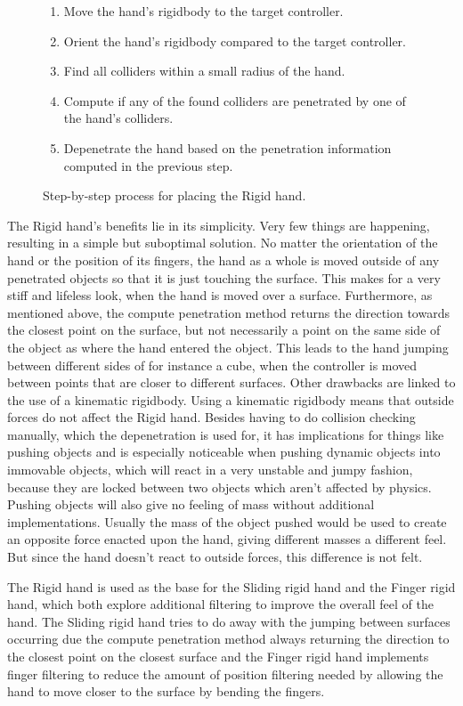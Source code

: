 \begin{figure}[H]
\centering
\small
\begin{enumerate}[noitemsep]
\item Move the hand's rigidbody to the target controller.
\item Orient the hand's rigidbody compared to the target controller.
\item Find all colliders within a small radius of the hand.
\item Compute if any of the found colliders are penetrated by one of the hand's colliders.
\item Depenetrate the hand based on the penetration information computed in the previous step.
\end{enumerate}
\caption{Step-by-step process for placing the Rigid hand.}
\label{fig:stepByStepRigidHand}
\end{figure}

The Rigid hand's benefits lie in its simplicity. Very few things are happening, resulting in a simple but suboptimal solution. No matter the orientation of the hand or the position of its fingers, the hand as a whole is moved outside of any penetrated objects so that it is just touching the surface. This makes for a very stiff and lifeless look, when the hand is moved over a surface. Furthermore, as mentioned above, the compute penetration method returns the direction towards the closest point on the surface, but not necessarily a point on the same side of the object as where the hand entered the object. This leads to the hand jumping between different sides of for instance a cube, when the controller is moved between points that are closer to different surfaces. Other drawbacks are linked to the use of a kinematic rigidbody. Using a kinematic rigidbody means that outside forces do not affect the Rigid hand. Besides having to do collision checking manually, which the depenetration is used for, it has implications for things like pushing objects and is especially noticeable when pushing dynamic objects into immovable objects, which will react in a very unstable and jumpy fashion, because they are locked between two objects which aren't affected by physics. Pushing objects will also give no feeling of mass without additional implementations. Usually the mass of the object pushed would be used to create an opposite force enacted upon the hand, giving different masses a different feel. But since the hand doesn't react to outside forces, this difference is not felt.

The Rigid hand is used as the base for the Sliding rigid hand and the Finger rigid hand, which both explore additional filtering to improve the overall feel of the hand. The Sliding rigid hand tries to do away with the jumping between surfaces occurring due the compute penetration method always returning the direction to the closest point on the closest surface and the Finger rigid hand implements finger filtering to reduce the amount of position filtering needed by allowing the hand to move closer to the surface by bending the fingers.

